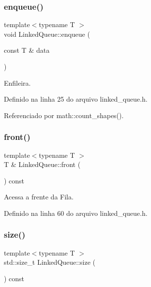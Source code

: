 \subsubsection{\texorpdfstring{enqueue()}{enqueue()}}
{\footnotesize\ttfamily template$<$typename T $>$ \\
void Linked\+Queue\+::enqueue (\begin{DoxyParamCaption}\item[{const T \&}]{data }\end{DoxyParamCaption})}



Enfileira. 



Definido na linha 25 do arquivo linked\+\_\+queue.\+h.



Referenciado por math\+::count\+\_\+shapes().

\mbox{\label{classstructures_1_1_linked_queue_aa6d2f0263b390193d2aae72499aa00b4}} 
\subsubsection{\texorpdfstring{front()}{front()}}
{\footnotesize\ttfamily template$<$typename T $>$ \\
T \& Linked\+Queue\+::front (\begin{DoxyParamCaption}{ }\end{DoxyParamCaption}) const}



Acessa a frente da Fila. 



Definido na linha 60 do arquivo linked\+\_\+queue.\+h.

\mbox{\label{classstructures_1_1_linked_queue_a97af1a092fe5f7f15182bf93d1bc396d}} 
\subsubsection{\texorpdfstring{size()}{size()}}
{\footnotesize\ttfamily template$<$typename T $>$ \\
std\+::size\+\_\+t Linked\+Queue\+::size (\begin{DoxyParamCaption}{ }\end{DoxyParamCaption}) const}



